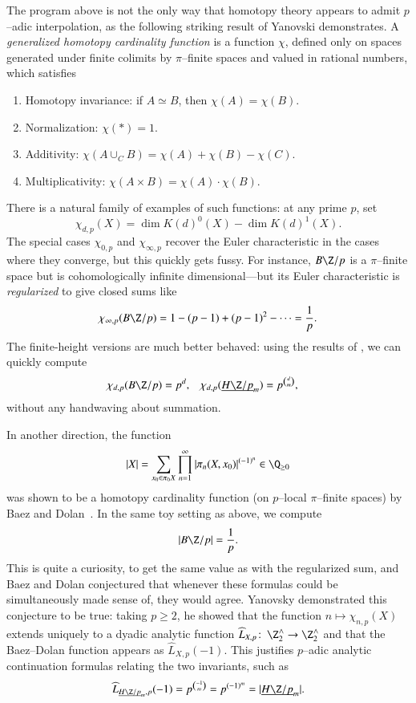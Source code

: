 The program above is not the only way that homotopy theory appears to admit $p$--adic interpolation, as the following striking result of Yanovski demonstrates.  A \textit{generalized homotopy cardinality function} is a function $\chi$, defined only on spaces generated under finite colimits by $\pi$--finite spaces and valued in rational numbers, which satisfies
\begin{enumerate}
    \item Homotopy invariance: if $A \simeq B$, then $\chi(A) = \chi(B)$.
    \item Normalization: $\chi(*) = 1$.
    \item Additivity: $\chi(A \cup_C B) = \chi(A) + \chi(B) - \chi(C)$.
    \item Multiplicativity: $\chi(A \times B) = \chi(A) \cdot \chi(B)$.
\end{enumerate}
There is a natural family of examples of such functions: at any prime $p$, set \[\chi_{d,p}(X) = \dim K(d)^0(X) - \dim K(d)^1(X).\]  The special cases $\chi_{0, p}$ and $\chi_{\infty, p}$ recover the Euler characteristic in the cases where they converge, but this quickly gets fussy.  For instance, $B\Z/p$ is a $\pi$--finite space but is cohomologically infinite dimensional---but its Euler characteristic is \textit{regularized} to give closed sums like \[\chi_{\infty, p}(B\Z/p) = 1 - (p-1) + (p-1)^2 - \cdots = \frac{1}{p}.\]  The finite-height versions are much better behaved: using the results of , we can quickly compute
\begin{align*}
\chi_{d,p}(B\Z/p) & = p^d, &
\chi_{d,p}(\OS{H\Z/p}{m}) & = p^{\binom{d}{m}},
\end{align*}
without any handwaving about summation.

In another direction, the function \[|X| = \sum_{x_0 \in \pi_0 X} \prod_{n=1}^\infty |\pi_n (X, x_0)|^{(-1)^n} \in \Q_{\ge 0}\] was shown to be a homotopy cardinality function (on $p$--local $\pi$--finite spaces) by Baez and Dolan~\cite{BaezDolan}.  In the same toy setting as above, we compute \[|B\Z/p| = \frac{1}{p}.\]  This is quite a curiosity, to get the same value as with the regularized sum, and Baez and Dolan conjectured that whenever these formulas could be simultaneously made sense of, they would agree.  Yanovsky demonstrated this conjecture to be true: taking $p \ge 2$, he showed that the function $n \mapsto \chi_{n, p}(X)$ extends uniquely to a dyadic analytic function $\widehat L_{X,p}\co \Z^\wedge_2 \to \Z^\wedge_2$ and that the Baez--Dolan function appears as $\widehat L_{X,p}(-1)$.  This justifies $p$--adic analytic continuation formulas relating the two invariants, such as \[\widehat L_{\OS{H\Z/p}{m}, p}(-1) = p^{\binom{-1}{m}} = p^{(-1)^m} = |\OS{H\Z/p}{m}|.\]







